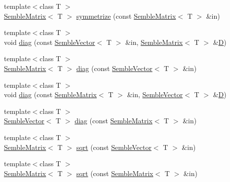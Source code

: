 \begin{DoxyCompactItemize}
\item 
{\footnotesize template$<$class T $>$ }\\\mbox{\hyperlink{structSEMBLE_1_1SembleMatrix}{Semble\+Matrix}}$<$ T $>$ \mbox{\hyperlink{namespaceSEMBLE_ac9a480d9a8ee28b38ce9a76238f72269}{symmetrize}} (const \mbox{\hyperlink{structSEMBLE_1_1SembleMatrix}{Semble\+Matrix}}$<$ T $>$ \&in)
\item 
{\footnotesize template$<$class T $>$ }\\void \mbox{\hyperlink{namespaceSEMBLE_a03aa1c70ca93395c3c1c0c43801121d7}{diag}} (const \mbox{\hyperlink{structSEMBLE_1_1SembleVector}{Semble\+Vector}}$<$ T $>$ \&in, \mbox{\hyperlink{structSEMBLE_1_1SembleMatrix}{Semble\+Matrix}}$<$ T $>$ \&\mbox{\hyperlink{test__db_8cc_a632e9ea5c3b489713d3f2d424f04e431}{D}})
\item 
{\footnotesize template$<$class T $>$ }\\\mbox{\hyperlink{structSEMBLE_1_1SembleMatrix}{Semble\+Matrix}}$<$ T $>$ \mbox{\hyperlink{namespaceSEMBLE_abf12d64435d2a9f32a96af271832a48f}{diag}} (const \mbox{\hyperlink{structSEMBLE_1_1SembleVector}{Semble\+Vector}}$<$ T $>$ \&in)
\item 
{\footnotesize template$<$class T $>$ }\\void \mbox{\hyperlink{namespaceSEMBLE_aacf744819291e7cc119d163000a16959}{diag}} (const \mbox{\hyperlink{structSEMBLE_1_1SembleMatrix}{Semble\+Matrix}}$<$ T $>$ \&in, \mbox{\hyperlink{structSEMBLE_1_1SembleVector}{Semble\+Vector}}$<$ T $>$ \&\mbox{\hyperlink{test__db_8cc_a632e9ea5c3b489713d3f2d424f04e431}{D}})
\item 
{\footnotesize template$<$class T $>$ }\\\mbox{\hyperlink{structSEMBLE_1_1SembleVector}{Semble\+Vector}}$<$ T $>$ \mbox{\hyperlink{namespaceSEMBLE_a9d03dce8aa30e05d79fd8a1426213671}{diag}} (const \mbox{\hyperlink{structSEMBLE_1_1SembleMatrix}{Semble\+Matrix}}$<$ T $>$ \&in)
\item 
{\footnotesize template$<$class T $>$ }\\\mbox{\hyperlink{structSEMBLE_1_1SembleMatrix}{Semble\+Matrix}}$<$ T $>$ \mbox{\hyperlink{namespaceSEMBLE_a82589c0c91229b7b8d90ac6ad20bcf48}{sqrt}} (const \mbox{\hyperlink{structSEMBLE_1_1SembleVector}{Semble\+Vector}}$<$ T $>$ \&in)
\item 
{\footnotesize template$<$class T $>$ }\\\mbox{\hyperlink{structSEMBLE_1_1SembleMatrix}{Semble\+Matrix}}$<$ T $>$ \mbox{\hyperlink{namespaceSEMBLE_a6843034758bd3b7a0fa76961bc4325f6}{sqrt}} (const \mbox{\hyperlink{structSEMBLE_1_1SembleMatrix}{Semble\+Matrix}}$<$ T $>$ \&in)

\end{DoxyCompactItemize}

